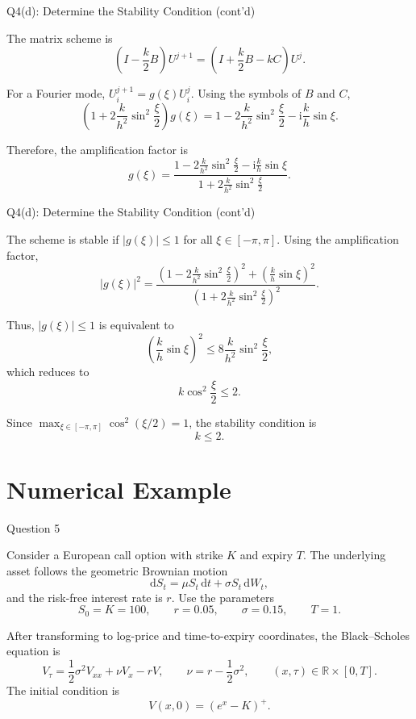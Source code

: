 \documentclass{beamer}
\newcommand{\dd}{\mathrm{d}}
\begin{document}
\begin{frame}{Q4(d): Determine the Stability Condition (cont'd)}

The matrix scheme is
\[
\left(I-\frac{k}{2}B\right)U^{j+1}
=
\left(I+\frac{k}{2}B-kC\right)U^j.
\]

For a Fourier mode, $U_i^{j+1}=g(\xi)U_i^j$. Using the symbols of
$B$ and $C$,
\[
\left(1+2\frac{k}{h^2}\sin^2\frac{\xi}{2}\right)g(\xi)
=
1-2\frac{k}{h^2}\sin^2\frac{\xi}{2}
-\mathrm{i}\frac{k}{h}\sin\xi.
\]

Therefore, the amplification factor is
\[
g(\xi)=
\frac{1-2\frac{k}{h^2}\sin^2\frac{\xi}{2}
-\mathrm{i}\frac{k}{h}\sin\xi}
{1+2\frac{k}{h^2}\sin^2\frac{\xi}{2}}.
\]

\end{frame}


\begin{frame}{Q4(d): Determine the Stability Condition (cont'd)}

The scheme is stable if $|g(\xi)|\le1$ for all $\xi\in[-\pi,\pi]$.
Using the amplification factor,
\[
|g(\xi)|^2
=
\frac{
\left(1-2\frac{k}{h^2}\sin^2\frac{\xi}{2}\right)^2
+\left(\frac{k}{h}\sin\xi\right)^2
}{
\left(1+2\frac{k}{h^2}\sin^2\frac{\xi}{2}\right)^2
}.
\]

Thus, $|g(\xi)|\le1$ is equivalent to
\[
\left(\frac{k}{h}\sin\xi\right)^2
\le 8\frac{k}{h^2}\sin^2\frac{\xi}{2},
\]
which reduces to
\[
k\cos^2\frac{\xi}{2}\le2.
\]

Since $\max_{\xi\in[-\pi,\pi]}\cos^2(\xi/2)=1$, the stability condition is
\[
\boxed{k\le2.}
\]

\end{frame}


\section[Numerical]{Numerical Example}

\begin{frame}{Question 5}

Consider a European call option with strike $K$ and expiry $T$. The
underlying asset follows the geometric Brownian motion
\[
\dd S_t=\mu S_t\,\dd t+\sigma S_t\,\dd W_t,
\]
and the risk-free interest rate is $r$. Use the parameters
\[
S_0=K=100,\qquad r=0.05,\qquad \sigma=0.15,\qquad T=1.
\]

After transforming to log-price and time-to-expiry coordinates, the
Black--Scholes equation is
\[
V_\tau=\frac12\sigma^2V_{xx}+\nu V_x-rV,
\qquad
\nu=r-\frac12\sigma^2,
\qquad (x,\tau)\in\mathbb{R}\times[0,T].
\]
The initial condition is
\[
V(x,0)=(e^x-K)^+.
\]
\end{frame}
\end{document}
